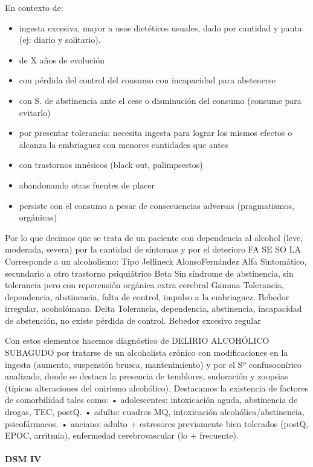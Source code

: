 \documentclass[encares.tex]{subfiles}
\begin{document}
En contexto de:
\begin{itemize}
\item ingesta excesiva, mayor a usos dietéticos usuales, dado por cantidad y pauta (ej: diario y solitario).
\item de X años de evolución
\item con pérdida del control del consumo con incapacidad para abstenerse
\item con S. de abstinencia ante el cese o disminución del consumo (consume para evitarlo)
\item por presentar tolerancia: necesita ingesta para lograr los mismos efectos o alcanza la embriaguez con menores cantidades que antes
\item con trastornos mnésicos (black out, palimpsestos)
\item abandonando otras fuentes de placer
\item persiste con el consumo a pesar de consecuencias adversas (pragmatismos, orgánicas)
\end{itemize}
Por lo que decimos que se trata de un paciente con dependencia al alcohol (leve, moderada, severa) por la cantidad de síntomas y por el deterioro FA SE SO LA Corresponde a un alcoholismo: Tipo Jellineck Alonso\-Fernández Alfa Sintomático, secundario a otro trastorno psiquiátrico Beta Sin síndrome de abstinencia, sin tolerancia pero con repercusión orgánica extra cerebral Gamma Tolerancia, dependencia, abstinencia, falta de control, impulso a la embriaguez. Bebedor irregular, acoholómano. Delta Tolerancia, dependencia, abstinencia, incapacidad de abstención, no existe pérdida de control. Bebedor excesivo regular

Con estos elementos hacemos diagnóstico de DELIRIO ALCOHÓLICO SUBAGUDO por tratarse de un alcoholista crónico con modificaciones en la ingesta (aumento, suspensión brusca, mantenimiento) y por el Sº confuso\-onírico analizado, donde se destaca la presencia de temblores, sudoración y zoopsias (típicas alteraciones del onirismo alcohólico). Destacamos la existencia de factores de comorbilidad tales como: • adolescentes: intoxicación aguda, abstinencia de drogas, TEC, postQ. • adulto: cuadros MQ, intoxicación alcohólica/abstinencia, psicofármacos. • anciano: adulto + estresores previamente bien tolerados (postQ, EPOC, arritmia), enfermedad cerebrovascular (lo + frecuente).
\paragraph{DSM IV}
\end{document}
